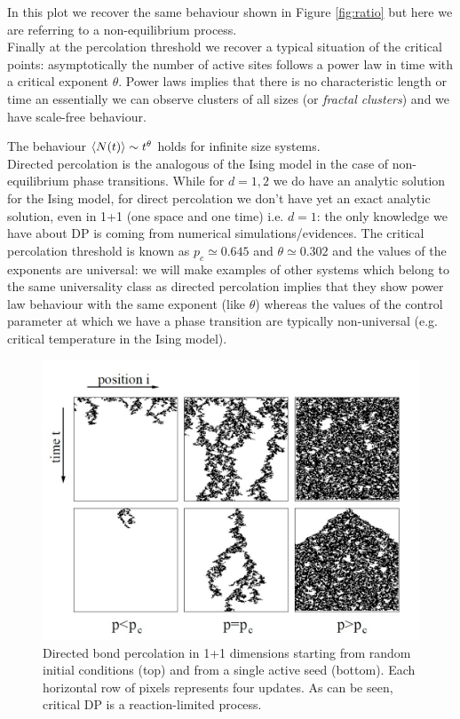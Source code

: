 \documentclass[\main/main.tex]{subfiles}
\begin{document}
In this plot we recover the same behaviour shown in Figure \ref{fig:ratio} but here we are referring to a non-equilibrium process. \\

Finally at the percolation threshold we recover a typical situation of the critical points: asymptotically the number of active sites follows a power law in time with a critical exponent $\theta$. Power laws implies that there is no characteristic length or time an essentially we can observe clusters of all sizes (or \textit{fractal clusters}) and we have scale-free behaviour.

The behaviour $\left\langle N(t) \right\rangle\sim t^\theta$ holds for infinite size systems. \\

Directed percolation is the analogous of the Ising model in the case of non-equilibrium phase transitions. While for $d=1,2$ we do have an analytic solution for the Ising model, for direct percolation we don't have yet an exact analytic solution, even in 1+1 (one space and one time) i.e. $d=1$: the only knowledge we have about DP is coming from numerical simulations/evidences. The critical percolation threshold is known as $p_c \simeq 0.645$ and $\theta\simeq 0.302$ and the values of the exponents are universal: we will make examples of other systems which belong to the same universality class as directed percolation implies that they show power law behaviour with the same exponent (like $\theta$) whereas the values of the control parameter at which we have a phase transition are typically non-universal (e.g. critical temperature in the Ising model). \\

\begin{figure}[ht]
    \centering
    \includegraphics[width=0.7\linewidth]{Lectures/Images/experc.jpg}
    \caption{Directed bond percolation in 1+1 dimensions starting from random initial conditions (top) and
from a single active seed (bottom). Each horizontal row of pixels represents four updates. As can be seen,
critical DP is a reaction-limited process.}
    \label{fig:experc}
\end{figure}
\end{document}
